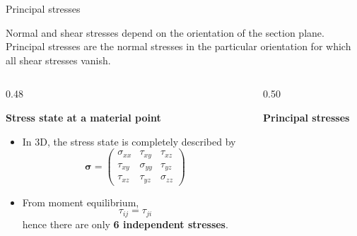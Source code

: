 \documentclass[aspectratio=169]{beamer}
\begin{document}
\begin{frame}{Principal stresses}
  \begin{block}{}\small Normal and shear stresses depend on the orientation of the section plane. Principal stresses are the normal stresses in the particular orientation for which all shear stresses vanish.
  \end{block}

  \begin{columns}[T]
    \begin{column}{0.48\textwidth}

      \large\textbf{Stress state at a material point}

      \vspace{0.15cm}

      \begin{itemize}

        \item \small In 3D, the stress state is completely described by
              \[
                \boxed{
                  \boldsymbol{\sigma}
                  =
                  \begin{pmatrix}
                    \sigma_{xx} & \tau_{xy}   & \tau_{xz}   \\
                    \tau_{xy}   & \sigma_{yy} & \tau_{yz}   \\
                    \tau_{xz}   & \tau_{yz}   & \sigma_{zz}
                  \end{pmatrix}
                }
              \]


        \item \small From moment equilibrium,
              \[
                \tau_{ij}=\tau_{ji}
              \]
              hence there are only \textbf{6 independent stresses}.

      \end{itemize}

    \end{column}

    \begin{column}{0.50\textwidth}

      \large\textbf{Principal stresses}

      \vspace{0.05cm}


\end{column}
\end{columns}
\end{frame}
\end{document}
